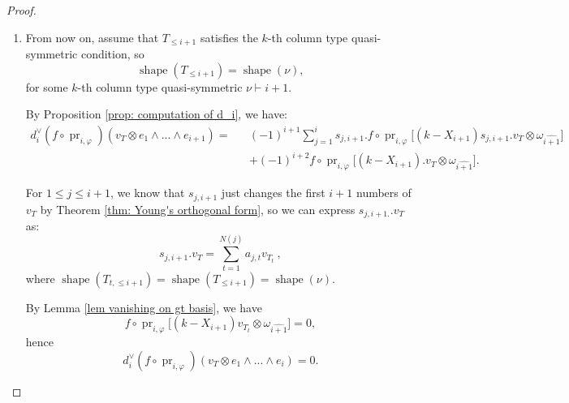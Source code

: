 \documentclass[11pt]{amsart}
\numberwithin{equation}{section}
\theoremstyle{definition}
\renewcommand{\phi}{\varphi}
\begin{document}
\begin{proof}
\begin{enumerate}
           \item
            From now on, assume that $T_{\leq i+1}$ satisfies the $k$-th column type quasi-symmetric condition, so
            \[
            \operatorname{shape}(T_{\leq i+1})=\operatorname{shape}(\nu),
            \]
          for some $k$-th column type quasi-symmetric $\nu\vdash i+1$. 

             By Proposition \ref{prop: computation of d_i}, we have:
            \begin{eqnarray*}
             d_{i}^{\vee}(f\circ\operatorname{pr}_{i,\phi})(v_T\otimes e_{1}\wedge...\wedge e_{i+1})=
             &&(-1)^{i+1}\sum_{j=1}^{i} s_{j,i+1}.f\circ\operatorname{pr}_{i,\phi}\big[(k-X_{i+1})s_{j,i+1}.v_T\otimes\omega_{\hat{i+1}} \big]\\
             &&+(-1)^{i+2}f\circ\operatorname{pr}_{i,\phi}\big[(k-X_{i+1}).v_T\otimes\omega_{\hat{i+1}}\big].
             \end{eqnarray*}
       
            For $1\leq j\leq i+1$, we know that $s_{j,i+1}$ just changes the first $i+1$ numbers of $v_{T}$ by Theorem \ref{thm: Young's orthogonal form}, so we can express $s_{j,i+1.}.v_{T}$ as: $$s_{j,i+1}.v_{T}=\sum_{t=1}^{N(j)}a_{j,t}v_{T_{t}}\ , $$
            where $\operatorname{shape}(T_{t,\leq i+1})=\operatorname{shape}(T_{\leq i+1})=\operatorname{shape}(\nu)$.

            By Lemma \ref{lem vanishing on gt   basis}, we have
            \[f\circ\operatorname{pr}_{i,\phi}\big[(k-X_{i+1})v_{T_{t}}\otimes\omega_{\hat{i+1}} \big] =0,
            \]
            hence \[
            d_{i}^{\vee}(f\circ\operatorname{pr}_{i,\phi})(v_{T}\otimes e_{1}\wedge...\wedge e_{i})=0.
            \]
           
            
             

\end{enumerate}
\end{proof}
\end{document}
